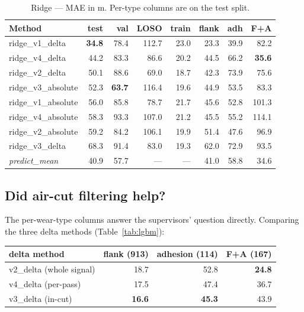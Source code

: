 \documentclass[11pt,a4paper]{article}
\begin{document}
\begin{table}[h]
\centering
\caption{Ridge --- MAE in \textmu m. Per-type columns are on the test split.}
\label{tab:ridge}
\small
\begin{tabular}{lrrrr|rrr}
\toprule
Method               & test & val & LOSO & train & flank & adh & F+A \\
\midrule
ridge\_v1\_delta     & \textbf{34.8} & 78.4 & 112.7 & 23.0 & 23.3 & 39.9 & 82.2 \\
ridge\_v4\_delta     & 44.2 & 83.3 & 86.6 & 20.2 & 44.5 & 66.2 & \textbf{35.6} \\
ridge\_v2\_delta     & 50.1 & 88.6 & 69.0 & 18.7 & 42.3 & 73.9 & 75.6 \\
ridge\_v3\_absolute  & 52.3 & \textbf{63.7} & 116.4 & 19.6 & 44.9 & 53.5 & 83.3 \\
ridge\_v1\_absolute  & 56.0 & 85.8 & 78.7 & 21.7 & 45.6 & 52.8 & 101.3 \\
ridge\_v4\_absolute  & 58.3 & 93.3 & 107.0 & 21.2 & 45.5 & 55.2 & 114.1 \\
ridge\_v2\_absolute  & 59.2 & 84.2 & 106.1 & 19.9 & 51.4 & 47.6 & 96.9 \\
ridge\_v3\_delta     & 68.3 & 91.4 & 83.0 & 19.3 & 62.0 & 72.9 & 93.5 \\
\midrule
\emph{predict\_mean} & 40.9 & 57.7 & --- & --- & 41.0 & 58.8 & 34.6 \\
\bottomrule
\end{tabular}
\end{table}

\subsection{Did air-cut filtering help?}
The per-wear-type columns answer the supervisors' question directly. Comparing
the three delta methods (Table~\ref{tab:lgbm}):

\begin{center}\small
\begin{tabular}{lrrr}
\toprule
delta method & flank (913) & adhesion (114) & F+A (167) \\
\midrule
v2\_delta (whole signal)   & 18.7 & 52.8 & \textbf{24.8} \\
v4\_delta (per-pass)       & 17.5 & 47.4 & 36.7 \\
v3\_delta (in-cut)         & \textbf{16.6} & \textbf{45.3} & 43.9 \\
\bottomrule
\end{tabular}
\end{center}
\end{document}
